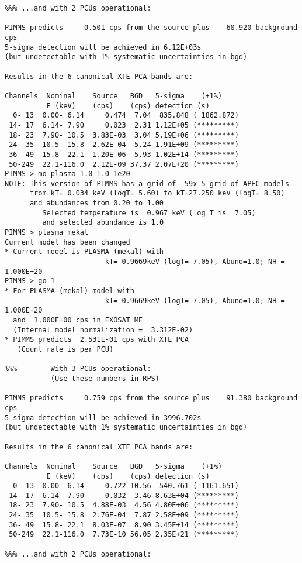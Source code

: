 \begin{verbatim}
%%% ...and with 2 PCUs operational:

PIMMS predicts     0.501 cps from the source plus    60.920 background cps
5-sigma detection will be achieved in 6.12E+03s
(but undetectable with 1% systematic uncertainties in bgd)

Results in the 6 canonical XTE PCA bands are:

Channels  Nominal    Source   BGD   5-sigma    (+1%)
          E (keV)    (cps)    (cps) detection (s)
  0- 13  0.00- 6.14     0.474  7.04  835.848 ( 1862.872)
 14- 17  6.14- 7.90     0.023  2.31 1.12E+05 (*********)
 18- 23  7.90- 10.5  3.83E-03  3.04 5.19E+06 (*********)
 24- 35  10.5- 15.8  2.62E-04  5.24 1.91E+09 (*********)
 36- 49  15.8- 22.1  1.20E-06  5.93 1.02E+14 (*********)
 50-249  22.1-116.0  2.12E-09 37.37 2.07E+20 (*********)
PIMMS > mo plasma 1.0 1.0 1e20
NOTE: This version of PIMMS has a grid of  59x 5 grid of APEC models
      from kT= 0.034 keV (logT= 5.60) to kT=27.250 keV (logT= 8.50)
      and abundances from 0.20 to 1.00
         Selected temperature is  0.967 keV (log T is  7.05)
         and selected abundance is 1.0
PIMMS > plasma mekal
Current model has been changed
* Current model is PLASMA (mekal) with
                        kT= 0.9669keV (logT= 7.05), Abund=1.0; NH =  1.000E+20
PIMMS > go 1
* For PLASMA (mekal) model with
                        kT= 0.9669keV (logT= 7.05), Abund=1.0; NH =  1.000E+20
  and  1.000E+00 cps in EXOSAT ME
  (Internal model normalization =  3.312E-02)
* PIMMS predicts  2.531E-01 cps with XTE PCA
   (Count rate is per PCU)

%%%        With 3 PCUs operational:
           (Use these numbers in RPS)

PIMMS predicts     0.759 cps from the source plus    91.380 background cps
5-sigma detection will be achieved in 3996.702s
(but undetectable with 1% systematic uncertainties in bgd)

Results in the 6 canonical XTE PCA bands are:

Channels  Nominal    Source   BGD   5-sigma    (+1%)
          E (keV)    (cps)    (cps) detection (s)
  0- 13  0.00- 6.14     0.722 10.56  540.761 ( 1161.651)
 14- 17  6.14- 7.90     0.032  3.46 8.63E+04 (*********)
 18- 23  7.90- 10.5  4.88E-03  4.56 4.80E+06 (*********)
 24- 35  10.5- 15.8  2.76E-04  7.87 2.58E+09 (*********)
 36- 49  15.8- 22.1  8.03E-07  8.90 3.45E+14 (*********)
 50-249  22.1-116.0  7.73E-10 56.05 2.35E+21 (*********)

%%% ...and with 2 PCUs operational:


\end{verbatim}
